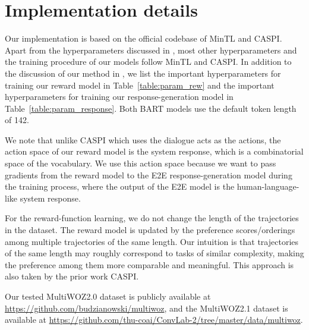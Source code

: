 \section{Implementation details} \label{sec:impl_details}

Our implementation is based on the official codebase of MinTL and CASPI.
Apart from the hyperparameters discussed in , most other hyperparameters and the training procedure of our models follow MinTL and CASPI.
In addition to the discussion of our method in , we list the important hyperparameters for training our reward model in Table~\ref{table:param_rew} and the important hyperparameters for training our response-generation model in Table~\ref{table:param_response}.
Both BART models use the default token length of 142. 

We note that unlike CASPI which uses the dialogue acts as the actions, the action space of our reward model is the system response, which is a combinatorial space of the vocabulary.
We use this action space because we want to pass gradients from the reward model to the E2E response-generation model during the training process, where the output of the E2E model is the human-language-like system response.

For the reward-function learning, we do not change the length of the trajectories in the dataset. 
The reward model is updated by the preference scores/orderings among multiple trajectories of the same length.
Our intuition is that trajectories of the same length may roughly correspond to tasks of similar complexity, making the preference among them more comparable and meaningful.
This approach is also taken by the prior work CASPI.

Our tested MultiWOZ2.0 dataset is publicly available at \href{https://github.com/budzianowski/multiwoz}{https://github.com/budzianowski/multiwoz}, and the MultiWOZ2.1 dataset is available at \href{https://github.com/thu-coai/ConvLab-2/tree/master/data/multiwoz}{https://github.com/thu-coai/ConvLab-2/tree/master/data/multiwoz}.

